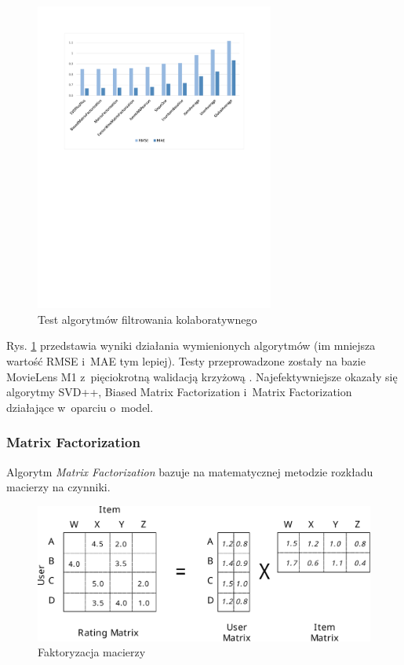 \documentclass[twoside]{iisthesis}
\begin{document}
	 \begin{figure}[!ht] 
	 	\centering
	 	\includegraphics[width=0.7\textwidth]{cfcomparision}
	 	\caption{Test algorytmów filtrowania kolaboratywnego \protect\cite{mymedialitedatasets}}
	 	\label{fig:cfcomparision}
	 \end{figure}
	 
	 Rys. \ref{fig:cfcomparision} przedstawia wyniki działania wymienionych algorytmów (im mniejsza wartość RMSE i~MAE tym lepiej). Testy przeprowadzone zostały na bazie MovieLens M1 z~pięciokrotną walidacją krzyżową \cite{harper2016movielens}. Najefektywniejsze okazały się algorytmy SVD++, Biased Matrix Factorization i~Matrix Factorization działające w~oparciu o~model.
	 
	 \subsubsection{Matrix Factorization}	
	 
	 Algorytm \textit{Matrix Factorization} bazuje na matematycznej metodzie rozkładu macierzy na czynniki.
	 
	 
	 \begin{figure}[!ht] 
	 	\centering
	 	\includegraphics[width=1\textwidth]{factorization}
	 	\caption{Faktoryzacja macierzy \protect\cite{id:ComputingRecommendationsExtremeScaleApacheFlink}}
	 	\label{fig:factorization}
	 \end{figure}
	 
\end{document}
